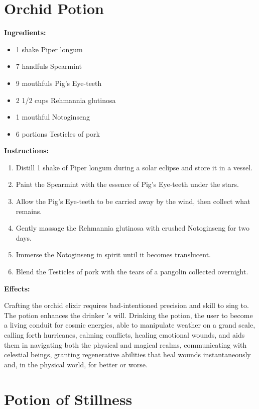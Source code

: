 \documentclass{article}
\begin{document}
\newpage
\section*{Orchid Potion}

\textbf{Ingredients:}

\begin{itemize}
  \item 1 shake Piper longum
  \item 7 handfuls Spearmint
  \item 9 mouthfuls Pig's Eye-teeth
  \item 2 1/2 cups Rehmannia glutinosa
  \item 1 mouthful Notoginseng
  \item 6 portions Testicles of pork
\end{itemize}

\textbf{Instructions:}

\begin{enumerate}
  \item Distill 1 shake of Piper longum during a solar eclipse and store it in a vessel.
  \item Paint the Spearmint with the essence of Pig's Eye-teeth under the stars.
  \item Allow the Pig's Eye-teeth to be carried away by the wind, then collect what remains.
  \item Gently massage the Rehmannia glutinosa with crushed Notoginseng for two days.
  \item Immerse the Notoginseng in spirit until it becomes translucent.
  \item Blend the Testicles of pork with the tears of a pangolin collected overnight.
\end{enumerate}

\textbf{Effects:}

Crafting the orchid elixir requires bad-intentioned precision and skill to sing to. The potion enhances the drinker 's will. Drinking the potion, the user to become a living conduit for cosmic energies, able to manipulate weather on a grand scale, calling forth hurricanes, calming conflicts, healing emotional wounds, and aids them in navigating both the physical and magical realms, communicating with celestial beings, granting regenerative abilities that heal wounds instantaneously and, in the physical world, for better or worse.

\newpage
\section*{Potion of Stillness}
\end{document}
